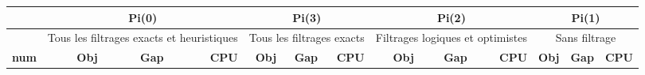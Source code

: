 \begin{table}[H]
	\centering
	\small
	\begin{tabular}{|r|rrr|rrr|rrr|rrr|}
		\toprule
		\hline
		\rowcolor{cyan}	& \multicolumn{3}{c|}{\textbf{Pi(0)}}&\multicolumn{3}{c|}{\textbf{Pi(3)}}&\multicolumn{3}{c|}{\textbf{Pi(2)}}&\multicolumn{3}{c|}{\textbf{Pi(1)}} \\ \hline
		\midrule
		
			\hline
		\rowcolor{cyan}	&\multicolumn{3}{c|}{ \tiny{Tous les filtrages exacts et heuristiques}} & \multicolumn{3}{c|}{\tiny{Tous les filtrages exacts}}&\multicolumn{3}{c|}{\tiny{Filtrages logiques et optimistes}}&\multicolumn{3}{c|}{\tiny{Sans filtrage}}
		\\ \hline
		\midrule
		
		\rowcolor{cyan}	\textbf{num} & \textbf{Obj}& \textbf{Gap}  & \textbf{CPU} & \textbf{Obj}& \textbf{Gap}  & \textbf{CPU} & \textbf{Obj}& \textbf{Gap}  & \textbf{CPU} & \textbf{Obj}&\textbf{Gap}  & \textbf{CPU} \\ \hline
		\midrule
	

\end{tabular}
\end{table}

